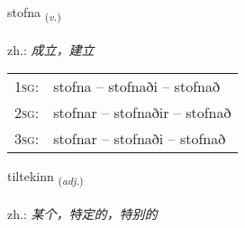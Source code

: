 \documentclass[frontgrid, backgrid]{flacards}\usepackage[]{graphicx}\usepackage[]{xcolor}
\begin{document}
{stofna \small{\textsubscript{(\textit{v.})}} \\[1ex] %
\textphonetic{[stɔpna]} \\
zh.: \emph{成立，建立} \\  [2ex]
\renewcommand*{\arraystretch}{0.8}
\begin{tabular}{p{1cm}l}
\textsc{1sg}: & stofna -- stofnaði -- stofnað \\ 
\textsc{2sg}: & stofnar -- stofnaðir -- stofnað \\ 
\textsc{3sg}: & stofnar -- stofnaði -- stofnað \\ 
\end{tabular}
}

\renewcommand{\flhead}{\vskip5pt \fboxsep=0pt {\small\bfseries\footnotesize Lýsingarorð | 形容词}}
\renewcommand{\fcfoot}{\vskip5pt \fboxsep=0pt \hspace{2pt}{\small\bfseries\footnotesize 1K}}

\renewcommand{\blhead}{\vskip5pt {\small\bfseries\footnotesize Lýsingarorð | 形容词 }}
\renewcommand{\bcfoot}{\vskip5pt \hspace{2pt}{\small\bfseries\footnotesize 1K}}


{tiltekinn \small{\textsubscript{(\textit{adj.})}} \\[1ex] %
\textphonetic{[tʰɪltʰɛcɪn]} \\
zh.: \emph{某个，特定的，特别的} \\  [2ex]
\renewcommand*{\arraystretch}{0.8}
}

\renewcommand{\flhead}{\vskip5pt \fboxsep=0pt {\small\bfseries\footnotesize Nafnorð | 名词}}
\renewcommand{\fcfoot}{\vskip5pt \fboxsep=0pt \hspace{2pt}{\small\bfseries\footnotesize 1K}}
\end{document}
